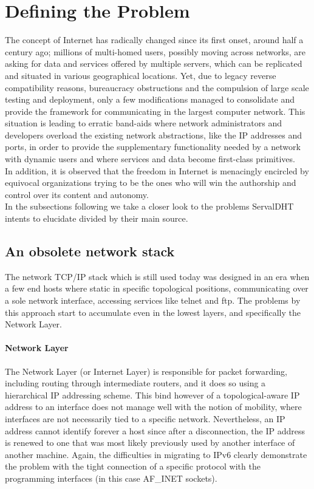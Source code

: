 \newpage
\section{Defining the Problem}
\label{problemdefinition}
The concept of Internet has radically changed since its first onset, around half a century ago; millions of multi-homed users, possibly moving across networks, are asking for data and services offered by multiple servers, which can be replicated and situated in various geographical locations.
Yet, due to legacy reverse compatibility reasons, bureaucracy obstructions and the compulsion of large scale testing and deployment, only a few modifications managed to consolidate and provide the framework for communicating in the largest computer network.
This situation is leading to erratic band-aids where network administrators and developers overload the existing network abstractions, like the IP  addresses and ports, in order to provide the supplementary functionality needed by a network with dynamic users and where services and data become first-class primitives.\\
\indent In addition, it is observed that the freedom in Internet is menacingly encircled by equivocal organizations trying to be the ones who will win the authorship and control over its content and autonomy.\\
\indent In the subsections following we take a closer look to the problems ServalDHT intents to elucidate divided by their main source.

\subsection{An obsolete network stack}
The network TCP/IP  stack which is still used today was designed in an era when a few end hosts where static in specific topological positions, communicating over a sole network interface, accessing services like telnet and ftp.
The problems by this approach start to accumulate even in the lowest layers, and specifically the Network Layer.
\paragraph{Network Layer} The Network Layer (or Internet Layer) is responsible for packet forwarding, including routing through intermediate routers, and it does so using a hierarchical IP addressing scheme.
This bind however of a topological-aware IP address to an interface does not manage well with the notion of mobility, where interfaces are not necessarily tied to a specific network.
Nevertheless, an IP address cannot identify forever a host since after a disconnection, the IP address is renewed to one that was most likely previously used by another interface of another machine.
Again, the difficulties in migrating to IPv6 clearly demonstrate the problem with the tight connection of a specific protocol with the programming interfaces (in this case AF\_INET sockets).
\pagebreak
